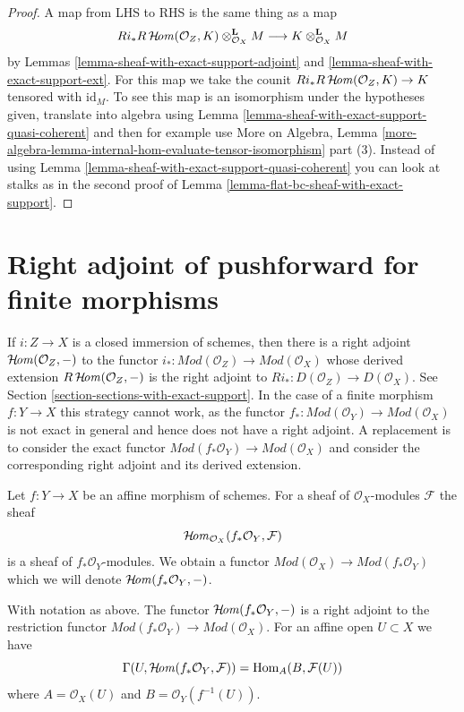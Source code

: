 \begin{proof}
A map from LHS to RHS is the same thing as a map
$$
Ri_*R\mathop{\mathcal{H}\!\mathit{om}}\nolimits(\mathcal{O}_Z, K) \otimes_{\mathcal{O}_X}^\mathbf{L} M
\longrightarrow
K \otimes_{\mathcal{O}_X}^\mathbf{L} M
$$
by Lemmas \ref{lemma-sheaf-with-exact-support-adjoint} and
\ref{lemma-sheaf-with-exact-support-ext}. For this map we take the
counit $Ri_*R\mathop{\mathcal{H}\!\mathit{om}}\nolimits(\mathcal{O}_Z, K) \to K$ tensored with $\text{id}_M$.
To see this map is an isomorphism under the hypotheses given,
translate into algebra using
Lemma \ref{lemma-sheaf-with-exact-support-quasi-coherent}
and then for example use More on Algebra, Lemma
\ref{more-algebra-lemma-internal-hom-evaluate-tensor-isomorphism} part (3).
Instead of using Lemma \ref{lemma-sheaf-with-exact-support-quasi-coherent}
you can look at stalks as in the second proof of
Lemma \ref{lemma-flat-bc-sheaf-with-exact-support}.
\end{proof}



\section{Right adjoint of pushforward for finite morphisms}
\label{section-duality-finite}

\noindent
If $i : Z \to X$ is a closed immersion of schemes, then there is
a right adjoint $\mathop{\mathcal{H}\!\mathit{om}}\nolimits(\mathcal{O}_Z, -)$ to the functor
$i_* : \textit{Mod}(\mathcal{O}_Z) \to \textit{Mod}(\mathcal{O}_X)$
whose derived extension $R\mathop{\mathcal{H}\!\mathit{om}}\nolimits(\mathcal{O}_Z, -)$
is the right adjoint to $Ri_* : D(\mathcal{O}_Z) \to D(\mathcal{O}_X)$. See
Section \ref{section-sections-with-exact-support}.
In the case of a finite morphism $f : Y \to X$ this strategy
cannot work, as the functor
$f_* : \textit{Mod}(\mathcal{O}_Y) \to \textit{Mod}(\mathcal{O}_X)$
is not exact in general and hence does not have a right adjoint.
A replacement is to consider the exact functor
$\textit{Mod}(f_*\mathcal{O}_Y) \to \textit{Mod}(\mathcal{O}_X)$
and consider the corresponding right adjoint and its derived
extension.

\medskip\noindent
Let $f : Y \to X$ be an affine morphism of schemes. For a sheaf
of $\mathcal{O}_X$-modules $\mathcal{F}$ the sheaf
$$
\mathop{\mathcal{H}\!\mathit{om}}\nolimits_{\mathcal{O}_X}(f_*\mathcal{O}_Y, \mathcal{F})
$$
is a sheaf of $f_*\mathcal{O}_Y$-modules. We obtain a functor
$\textit{Mod}(\mathcal{O}_X) \to \textit{Mod}(f_*\mathcal{O}_Y)$
which we will denote $\mathop{\mathcal{H}\!\mathit{om}}\nolimits(f_*\mathcal{O}_Y, -)$.

\begin{lemma}
\label{lemma-compute-sheafhom-affine}
With notation as above. The functor $\mathop{\mathcal{H}\!\mathit{om}}\nolimits(f_*\mathcal{O}_Y, -)$ is a
right adjoint to the restriction functor
$\textit{Mod}(f_*\mathcal{O}_Y) \to \textit{Mod}(\mathcal{O}_X)$.
For an affine open $U \subset X$ we have
$$
\Gamma(U, \mathop{\mathcal{H}\!\mathit{om}}\nolimits(f_*\mathcal{O}_Y, \mathcal{F})) =
\mathop{\mathrm{Hom}}\nolimits_A(B, \mathcal{F}(U))
$$
where $A = \mathcal{O}_X(U)$ and $B = \mathcal{O}_Y(f^{-1}(U))$.
\end{lemma}

